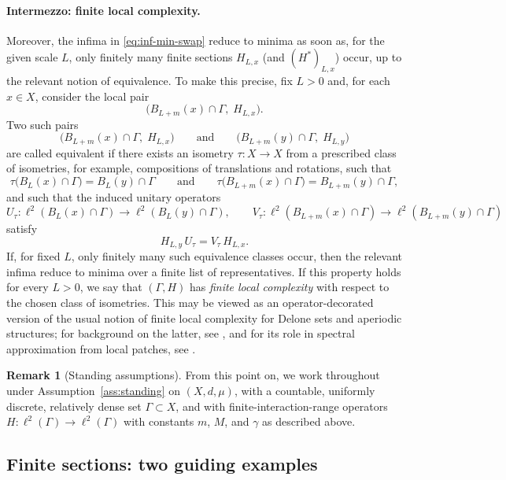 \documentclass[11pt]{article}
\theoremstyle{definition}
\newtheorem{remark}[theorem]{Remark}
\begin{document}
\paragraph{Intermezzo: finite local complexity.}
\label{intermezzo: flc}
Moreover, the infima in \eqref{eq:inf-min-swap} reduce to minima as soon as, for the given scale $L$, only finitely many finite sections $H_{L,x}$ (and $(H^*)_{L,x}$) occur, up to the relevant notion of equivalence. To make this precise, fix $L>0$ and, for each $x\in X$, consider the local pair
\[
  \bigl(B_{L+m}(x)\cap\Gamma,\; H_{L,x}\bigr).
\]
Two such pairs
\[
  \bigl(B_{L+m}(x)\cap\Gamma,\; H_{L,x}\bigr)
  \qquad\text{and}\qquad
  \bigl(B_{L+m}(y)\cap\Gamma,\; H_{L,y}\bigr)
\]
are called equivalent if there exists an isometry $\tau:X\to X$ from a prescribed class of isometries, for example, compositions of translations and rotations, such that
\[
  \tau\bigl(B_L(x)\cap\Gamma\bigr)=B_L(y)\cap\Gamma
  \qquad\text{and}\qquad
  \tau\bigl(B_{L+m}(x)\cap\Gamma\bigr)=B_{L+m}(y)\cap\Gamma,
\]
and such that the induced unitary operators
\[
  U_\tau:\ell^2(B_L(x)\cap\Gamma)\to \ell^2(B_L(y)\cap\Gamma),
  \qquad
  V_\tau:\ell^2(B_{L+m}(x)\cap\Gamma)\to \ell^2(B_{L+m}(y)\cap\Gamma)
\]
satisfy
\[
  H_{L,y}\,U_\tau=V_\tau\,H_{L,x}.
\]
If, for fixed $L$, only finitely many such equivalence classes occur, then the relevant infima reduce to minima over a finite list of representatives. If this property holds for every $L>0$, we say that $(\Gamma,H)$ has
\emph{finite local complexity} with respect to the chosen class of
isometries. This may be viewed as an operator-decorated version of the
usual notion of finite local complexity for Delone sets and aperiodic
structures; for background on the latter, see
\cite{BaakeGrimm2013}, and for its role in
spectral approximation from local patches, see
\cite{Hege2024Thesis,HegeMoscolariTeufel2026}.

\begin{remark}[Standing assumptions]
\label{rem:standing-assumptions}
From this point on, we work throughout under Assumption~\ref{ass:standing}
on $(X,d,\mu)$, with a countable, uniformly discrete, relatively dense set $\Gamma\subset X$,
and with finite-interaction-range operators $H:\ell^2(\Gamma)\to\ell^2(\Gamma)$ with constants
$m$, $M$, and $\gamma$ as described above.
\end{remark}

\subsection{Finite sections: two guiding examples}
\label{sec:finite-sections-examples}
\end{document}
